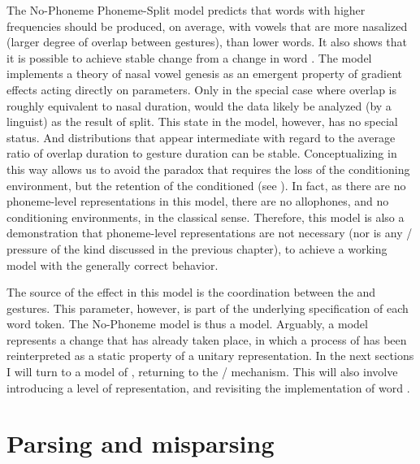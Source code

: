 The No-Phoneme Phoneme-Split model predicts that words with higher
frequencies should be produced, on average, with vowels that are more
nasalized (larger degree of overlap between gestures), than lower
 words. It also shows that it is possible to achieve stable
 change from a change in word . The model implements
a theory of nasal vowel genesis as an emergent property of gradient
effects acting directly on  parameters. Only in the special
case where overlap is roughly equivalent to nasal duration, would
the data likely be analyzed (by a linguist) as the result of 
split. This state in the model, however, has no special status. And
distributions that appear intermediate with regard to the average
ratio of overlap duration to  gesture duration can be stable.
Conceptualizing  in this way allows us to avoid the 
paradox that requires the loss of the conditioning environment, but
the retention of the conditioned  (see ).
In fact, as there are no phoneme-level representations in this model,
there are no allophones, and no conditioning environments, in the
classical sense. Therefore, this model is also a demonstration that
phoneme-level representations are not necessary (nor is any /
pressure of the kind discussed in the previous chapter), to achieve
a working model with the generally correct behavior. 

The source of the  effect in this model is the coordination
between the  and  gestures. This parameter, however,
is part of the underlying specification of each word token. The No-Phoneme
model is thus a  model. Arguably, a  model
represents a change that has already taken place, in which a process
of  has been reinterpreted as a static property of a unitary
representation. In the next sections I will turn to a 
model of , returning to the /
 mechanism. This will also involve introducing a 
level of representation, and revisiting the implementation of word
.

\section{Parsing and misparsing}

